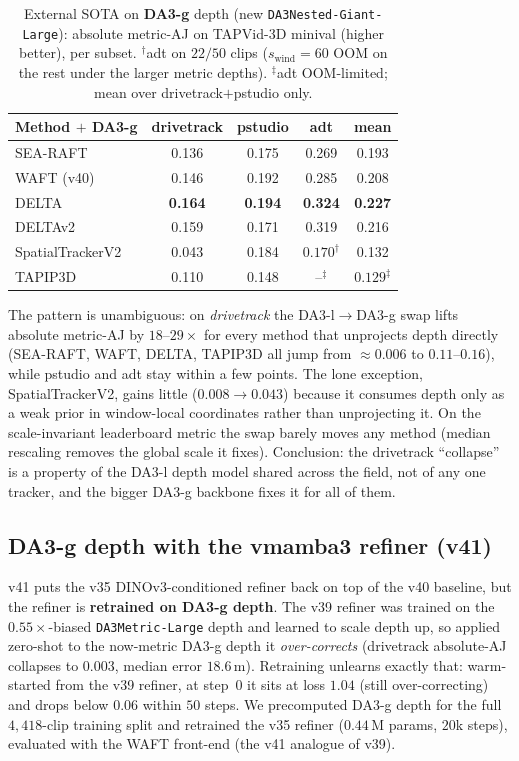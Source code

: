 \documentclass[11pt,a4paper]{article}
\begin{document}
\begin{table}[h]
\centering
\caption{External SOTA on \textbf{DA3-g} depth (new \texttt{DA3Nested-Giant-Large}): absolute metric-AJ on
TAPVid-3D minival (higher better), per subset. $^{\dagger}$adt on $22/50$ clips ($s_{\text{wind}}{=}60$
OOM on the rest under the larger metric depths). $^{\ddagger}$adt OOM-limited; mean over
drivetrack$+$pstudio only.}
\label{tab:da3g-sota}
\begin{tabular}{lcccc}
\toprule
Method $+$ DA3-g & drivetrack & pstudio & adt & mean \\
\midrule
SEA-RAFT         & 0.136 & 0.175 & 0.269 & 0.193 \\
WAFT (v40)       & 0.146 & 0.192 & 0.285 & 0.208 \\
DELTA            & \textbf{0.164} & \textbf{0.194} & \textbf{0.324} & \textbf{0.227} \\
DELTAv2          & 0.159 & 0.171 & 0.319 & 0.216 \\
SpatialTrackerV2 & 0.043 & 0.184 & $0.170^{\dagger}$ & 0.132 \\
TAPIP3D          & 0.110 & 0.148 & --$^{\ddagger}$ & $0.129^{\ddagger}$ \\
\bottomrule
\end{tabular}
\end{table}

The pattern is unambiguous: on \emph{drivetrack} the DA3-l$\to$DA3-g swap lifts absolute metric-AJ by
$18$--$29\times$ for every method that unprojects depth directly (SEA-RAFT, WAFT, DELTA, TAPIP3D all jump
from ${\approx}0.006$ to $0.11$--$0.16$), while pstudio and adt stay within a few points. The lone
exception, SpatialTrackerV2, gains little ($0.008\!\to\!0.043$) because it consumes depth only as a weak
prior in window-local coordinates rather than unprojecting it. On the scale-invariant leaderboard metric
the swap barely moves any method (median rescaling removes the global scale it fixes). Conclusion: the
drivetrack ``collapse'' is a property of the DA3-l depth model shared across the field, not of any one
tracker, and the bigger DA3-g backbone fixes it for all of them.

\subsection{DA3-g depth with the vmamba3 refiner (v41)}
\label{sec:v41}
v41 puts the v35 DINOv3-conditioned refiner back on top of the v40 baseline, but the refiner is
\textbf{retrained on DA3-g depth}. The v39 refiner was trained on the $0.55\times$-biased
\texttt{DA3Metric-Large} depth and learned to scale depth up, so applied zero-shot to the now-metric
DA3-g depth it \emph{over-corrects} (drivetrack absolute-AJ collapses to $0.003$, median error
$18.6$\,m). Retraining unlearns exactly that: warm-started from the v39 refiner, at step~0 it sits at
loss $1.04$ (still over-correcting) and drops below $0.06$ within $50$ steps. We precomputed DA3-g depth
for the full $4{,}418$-clip training split and retrained the v35 refiner ($0.44$\,M params, $20$k steps),
evaluated with the WAFT front-end (the v41 analogue of v39).
\end{document}
